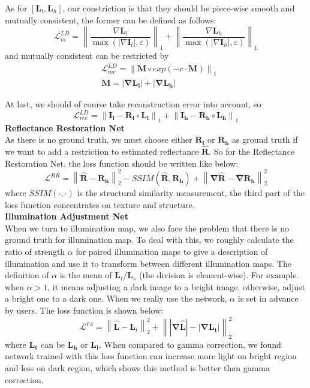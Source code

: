 \documentclass[10pt,twocolumn,letterpaper]{article}
\begin{document}
As for $[\mathbf{L}_l,\mathbf{L}_h]$, our constriction is that they should be piece-wise smooth and mutually consistent, the former can be defined as follows:
\begin{equation}
    \mathcal{L}_{is}^{LD} = \left\| \frac{\nabla \mathbf{L}_l}{\max(|\nabla \mathbf{I}_l|, \varepsilon)}\right\|_1 + \left\| \frac{\nabla \mathbf{L}_h}{\max(|\nabla \mathbf{I}_h|, \varepsilon)}\right\|_1
\end{equation}
and mutually consistent can be restricted by 
\begin{align}
   &\mathcal{L}_{mc}^{LD} = \left\|\mathbf{M} \circ exp(-c \cdot \mathbf{M})\right\|_1 \\
   & \mathbf{M = |\nabla L_l| + |\nabla L_h|}
\end{align}

At last, we should of course take reconstruction error into account, so
\begin{equation}
    \mathcal{L}_{rec}^{LD} = \left\| \mathbf{I_l - R_l \circ L_l} \right\|_1 + \left\| \mathbf{I_h - R_h \circ L_h} \right\|_1
\end{equation}
\textbf{Reflectance Restoration Net}\\
As there is no ground truth, we must choose either $\mathbf{R_l}$ or $\mathbf{R_h}$ as ground truth if we want to add a restriction to estimated reflectance $\mathbf{\hat{R}}$. So for the Reflectance Restoration Net, the loss function should be written like below:
\begin{equation}
    \mathcal{L}^{RR} = \left\| \mathbf{\hat{R} - R_h } \right\|_2^2  - SSIM(\mathbf{\hat{R},R_h}) + \left\| \mathbf{\nabla \hat{R} - \nabla R_h } \right\|_2^2
\end{equation}
where $SSIM(\cdot,\cdot)$ is the structural similarity measurement, the third part of the loss function concentrates on texture and structure.\\
\textbf{Illumination Adjustment Net} \\
When we turn to illumination map, we also face the problem that there is no ground truth for illumination map. To deal with this, we roughly calculate the ratio of strength $\alpha$ for paired illumination maps to give a description of illumination and use it to transform between different illumination maps. The definition of $\alpha$ is the mean of $\mathbf{L}_t/\mathbf{L}_s$ (the division is element-wise). For example. when $\alpha > 1$, it means adjusting a dark image to a bright image, otherwise, adjust a bright one to a dark one. When we really use the network, $\alpha$ is set in advance by users. The loss function is shown below:
\begin{equation}
    \mathcal{L}^{IA} = \left\| \mathbf{\hat{L}} - \mathbf{L}_t\right\|_2^2 + \left\| \mathbf{|\nabla \hat{L}| - |\nabla L_t |}\right\|_2^2
\end{equation}
where $\mathbf{L_t}$ can be $\mathbf{L_h}$ or $\mathbf{L_l}$. When compared to gamma correction, we found network trained with this loss function can increase more light on bright region and less on dark region, which shows this method is better than gamma correction.
\end{document}
